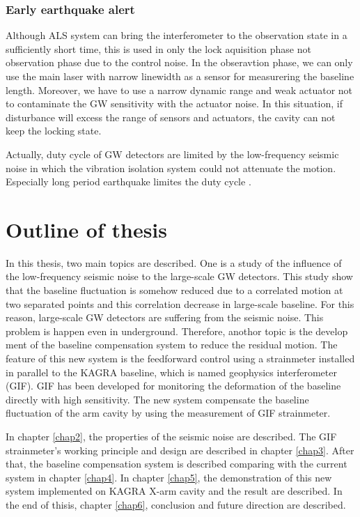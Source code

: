 \subsubsection{Early earthquake alert}
Although ALS system can bring the interferometer to the observation state in a sufficiently short time, this is used in only the lock aquisition phase not observation phase due to the control noise. In the obseravtion phase, we can only use the main laser with narrow linewidth as a sensor for measurering the baseline length. Moreover, we have to use a narrow dynamic range and weak actuator not to contaminate the GW sensitivity with the actuator noise. In this situation, if disturbance will excess the range of sensors and actuators, the cavity can not keep the locking state. 

Actually, duty cycle of GW detectors are limited by the low-frequency seismic noise in which the vibration isolation system could not attenuate the motion. Especially long period earthquake limites the duty cycle \cite{Biscans2018control}. 

\section{Outline of thesis} \label{sec:15}
In this thesis, two main topics are described. One is a study of the influence of the low-frequency seismic noise to the large-scale GW detectors. This study show that the baseline fluctuation is somehow reduced due to a correlated motion at two separated points and this correlation decrease in large-scale baseline. For this reason, large-scale GW detectors are suffering from the seismic noise. This problem is happen even in underground. Therefore, anothor topic is the develop ment of the baseline compensation system to reduce the residual motion. The feature of this new system is the feedforward control using a strainmeter installed in parallel to the KAGRA baseline, which is named geophysics interferometer (GIF). GIF has been developed for monitoring the deformation of the baseline directly with high sensitivity. The new system compensate the baseline fluctuation of the arm cavity by using the measurement of GIF strainmeter.

In chapter \cref{chap2}, the properties of the seismic noise are described. The GIF strainmeter's working principle and design are described in chapter \cref{chap3}. After that, the baseline compensation system is described comparing with the current system in chapter \cref{chap4}. In chapter \cref{chap5}, the demonstration of this new system implemented on KAGRA X-arm cavity and the result are described. In the end of thisis, chapter \cref{chap6}, conclusion and future direction are described.

